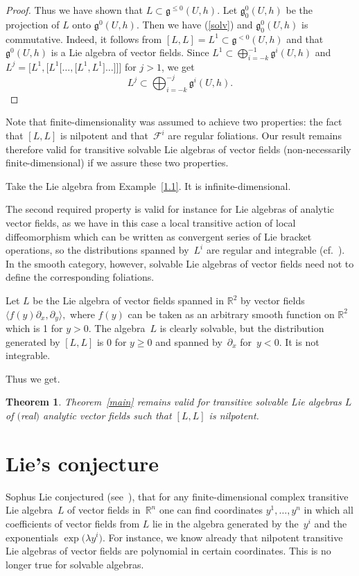 \documentclass[pdftex]{sigma}
\numberwithin{equation}{section}
\newtheorem{Theorem}{Theorem}[section]
\begin{document}
\begin{proof}
Thus we have shown that $L\subset\mathfrak{g}^{\le 0}(U,h)$. Let $\mathfrak{g}^{0}_0(U,h)$ be the projection of $L$ onto $\mathfrak{g}^{0}(U,h)$. Then we have (\ref{solv}) and $\mathfrak{g}^{0}_0(U,h)$ is commutative.
Indeed, it follows from $[L,L]=L^1\subset\mathfrak{g}^{< 0}(U,h)$ and that $\mathfrak{g}^{0}(U,h)$ is a Lie algebra of vector fields. Since $L^1\subset \bigoplus_{i=-k}^{-1}\mathfrak{g}^i(U,h)$ and $L^j=\big[L^1,\big[L^1\big[\dots,\big[L^1,L^1\big]\dots\big]\big]\big]$ for $j>1$, we get
\[L^j\subset \bigoplus_{i=-k}^{-j}\mathfrak{g}^i(U,h) .\tag*{\qed}\]
\renewcommand{\qed}{}
\end{proof}

Note that finite-dimensionality was assumed to achieve two properties: the fact that $[L,L]$ is nilpotent and that~${\mathcal F}^i$ are regular foliations. Our result remains therefore valid for transitive solvable Lie algebras of vector fields (non-necessarily finite-dimensional) if we assure these two properties.
\begin{Example} Take the Lie algebra from Example~\ref{1.1}. It is infinite-dimensional.
\end{Example}

The second required property is valid for instance for Lie algebras of analytic vector fields, as we have in this case a local transitive action of local diffeomorphism which can be written as convergent series of Lie bracket operations, so the distributions spanned by~$L^i$ are regular and integrable (cf.~\cite{nagano66}). In the smooth category, however, solvable Lie algebras of vector fields need not to define the corresponding foliations.
\begin{Example}
Let $L$ be the Lie algebra of vector fields spanned in ${\mathbb R}^2$ by vector fields $\langle f(y)\partial_x{,}\partial_y\rangle,\!$ where $f(y)$ can be taken as an arbitrary smooth function on ${\mathbb R}^2$ which is 1 for $y>0$. The algebra~$L$ is clearly solvable, but the distribution generated by $[L,L]$ is 0 for $y\ge 0$ and spanned by~$\partial_x$ for~$y<0$. It is not integrable.
\end{Example}
Thus we get.
\begin{Theorem}Theorem~{\rm \ref{main}} remains valid for transitive solvable Lie algebras $L$ of $($real$)$ analytic vector fields such that $[L,L]$ is nilpotent.
\end{Theorem}

\section{Lie's conjecture}
Sophus Lie conjectured (see~\cite{Lie3}), that for any finite-dimensional complex transitive Lie algebra~$L$ of vector fields in~${\mathbb R}^n$ one can find coordinates $y^1,\dots,y^n$ in which all coefficients
of vector fields from $L$ lie in the algebra generated by the~$y^i$ and the exponentials $\exp\big(\lambda y^i\big)$. For instance, we know already that nilpotent transitive Lie algebras of vector fields are polynomial in certain coordinates. This is no longer true for solvable algebras.
\end{document}
